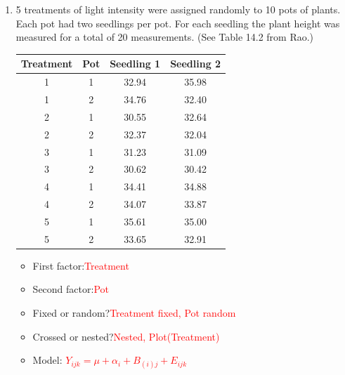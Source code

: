 \begin{enumerate}
\item 5 treatments of light intensity were assigned randomly to 10 pots of plants.  Each pot had two seedlings per pot.  For each seedling the plant height was measured for a total of 20 measurements. (See Table 14.2 from Rao.)
\begin{small}
\begin{center}
\begin{tabular}{cc|cc}
Treatment & Pot & Seedling 1 & Seedling 2 \\ \hline
1          &       1       &      32.94      &      35.98 \\
1          &       2       &      34.76      &      32.40 \\
2          &       1       &      30.55      &      32.64 \\
2          &       2       &      32.37      &      32.04 \\
3          &       1       &      31.23      &      31.09 \\
3          &       2       &      30.62      &      30.42 \\
4          &       1       &      34.41      &      34.88 \\
4          &       2       &      34.07      &      33.87 \\
5          &       1       &      35.61      &      35.00 \\
5          &       2       &      33.65      &      32.91 \\ \hline
\end{tabular}
\end{center}
\end{small}

\begin{itemize}
\item First factor:\textcolor{red}{Treatment}
\item Second factor:\textcolor{red}{Pot}
\item Fixed or random?\textcolor{red}{Treatment fixed, Pot random}
\item Crossed or nested?\textcolor{red}{Nested, Plot(Treatment)}
\item Model: %
\textcolor{red}{$Y_{ijk} = \mu + \alpha_i+B_{(i)j} + E_{ijk}$}
\end{itemize}
\end{enumerate}

